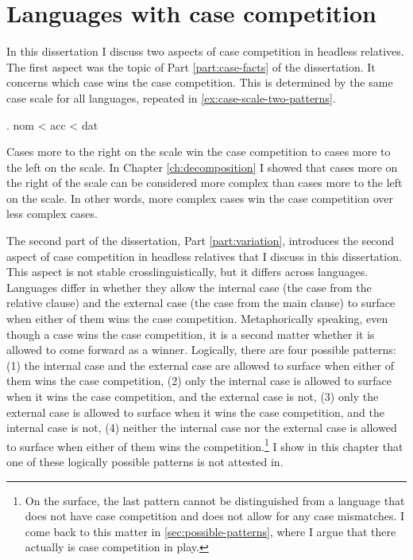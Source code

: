 
\chapter{Languages with case competition}\label{ch:typology}

In this dissertation I discuss two aspects of case competition in headless relatives. The first aspect was the topic of Part \ref{part:case-facts} of the dissertation. It concerns which case wins the case competition. This is determined by the same case scale for all languages, repeated in \ref{ex:case-scale-two-patterns}.

\ex. \ac{nom} < \ac{acc} < \ac{dat}\label{ex:case-scale-two-patterns}

Cases more to the right on the scale win the case competition to cases more to the left on the scale.
In Chapter \ref{ch:decomposition} I showed that cases more on the right of the scale can be considered more complex than cases more to the left on the scale. In other words, more complex cases win the case competition over less complex cases.

The second part of the dissertation, Part \ref{part:variation}, introduces the second aspect of case competition in headless relatives that I discuss in this dissertation. This aspect is not stable crosslinguistically, but it differs across languages. Languages differ in whether they allow the internal case (the case from the relative clause) and the external case (the case from the main clause) to surface when either of them wins the case competition. Metaphorically speaking, even though a case wins the case competition, it is a second matter whether it is allowed to come forward as a winner. Logically, there are four possible patterns: (1) the internal case and the external case are allowed to surface when either of them wins the case competition, (2) only the internal case is allowed to surface when it wins the case competition, and the external case is not, (3) only the external case is allowed to surface when it wins the case competition, and the internal case is not, (4) neither the internal case nor the external case is allowed to surface when either of them wins the competition.\footnote{
On the surface, the last pattern cannot be distinguished from a language that does not have case competition and does not allow for any case mismatches. I come back to this matter in \ref{sec:possible-patterns}, where I argue that there actually is case competition in play.
}
I show in this chapter that one of these logically possible patterns is not attested in.

